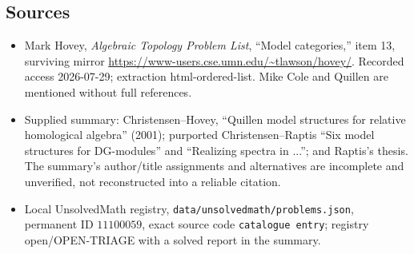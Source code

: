 \documentclass[11pt]{article}
\begin{document}
\subsection{Sources}
\begin{itemize}
\item Mark Hovey, \emph{Algebraic Topology Problem List}, ``Model categories,'' item 13, surviving mirror \url{https://www-users.cse.umn.edu/~tlawson/hovey/}. Recorded access 2026-07-29; extraction html-ordered-list. Mike Cole and Quillen are mentioned without full references.
\item Supplied summary: Christensen--Hovey, ``Quillen model structures for relative homological algebra'' (2001); purported Christensen--Raptis ``Six model structures for DG-modules'' and ``Realizing spectra in ...''; and Raptis's thesis. The summary's author/title assignments and alternatives are incomplete and unverified, not reconstructed into a reliable citation.
\item Local UnsolvedMath registry, \texttt{data/unsolvedmath/problems.json}, permanent ID \(11100059\), exact source code \texttt{catalogue entry}; registry open/OPEN-TRIAGE with a solved report in the summary.
\end{itemize}
\end{document}

